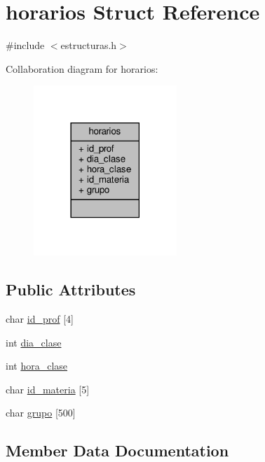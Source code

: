 \hypertarget{structhorarios}{}\section{horarios Struct Reference}
\label{structhorarios}


{\ttfamily \#include $<$estructuras.\+h$>$}



Collaboration diagram for horarios\+:\nopagebreak
\begin{figure}[H]
\begin{center}
\leavevmode
\includegraphics[width=153pt]{structhorarios__coll__graph}
\end{center}
\end{figure}
\subsection*{Public Attributes}
\begin{DoxyCompactItemize}
\item 
char \mbox{\hyperlink{structhorarios_a10531356ac4d127379c96ad1006873f8}{id\+\_\+prof}} \mbox{[}4\mbox{]}
\item 
int \mbox{\hyperlink{structhorarios_a514443404c267c542497e9c22f6d3e25}{dia\+\_\+clase}}
\item 
int \mbox{\hyperlink{structhorarios_a5ed630f7244ecfbe4c29f08ffb009472}{hora\+\_\+clase}}
\item 
char \mbox{\hyperlink{structhorarios_adbe2c73c92199ce4ac6e03b7cdbe9b72}{id\+\_\+materia}} \mbox{[}5\mbox{]}
\item 
char \mbox{\hyperlink{structhorarios_a435f7d8029b65cba591011c6d86ce284}{grupo}} \mbox{[}500\mbox{]}
\end{DoxyCompactItemize}


\subsection{Member Data Documentation}
\mbox{\label{structhorarios_a514443404c267c542497e9c22f6d3e25}} 
